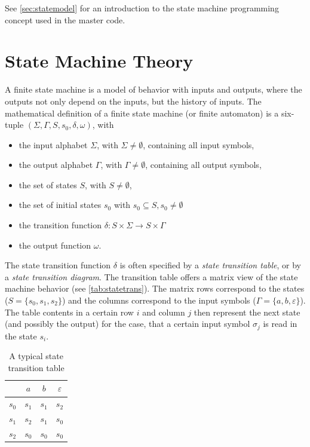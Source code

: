 \documentclass[a4paper,12pt,BCOR6mm,bibtotoc,idxtotoc]{scrbook}
\begin{document}
See \autoref{sec:statemodel} for an introduction to the state machine
programming concept used in the master code.


\section{State Machine Theory}
\label{sec:fsmtheory}

A finite state machine \cite{automata} is a model of behavior with
inputs and outputs, where the outputs not only depend on the inputs,
but the history of inputs. The mathematical definition of a finite
state machine (or finite automaton) is a six-tuple $(\Sigma, \Gamma,
S, s_0, \delta, \omega)$, with

\begin{itemize}
\item the input alphabet $\Sigma$, with $\Sigma \neq
  \emptyset$, containing all input symbols,
\item the output alphabet $\Gamma$, with $\Gamma \neq
  \emptyset$, containing all output symbols,
\item the set of states $S$, with $S \neq \emptyset$,
\item the set of initial states $s_0$ with $s_0 \subseteq S, s_0 \neq
  \emptyset$
\item the transition function $\delta: S \times \Sigma \rightarrow S
  \times \Gamma$
\item the output function $\omega$.
\end{itemize}

The state transition function $\delta$ is often specified by a
\textit{state transition table}, or by a \textit{state transition
  diagram}. The transition table offers a matrix view of the state
machine behavior (see \autoref{tab:statetrans}). The matrix rows
correspond to the states ($S = \{s_0, s_1, s_2\}$) and the columns
correspond to the input symbols ($\Gamma = \{a, b, \varepsilon\}$).
The table contents in a certain row $i$ and column $j$ then represent
the next state (and possibly the output) for the case, that a certain
input symbol $\sigma_j$ is read in the state $s_i$.

\begin{table}[htbp]
  \caption{A typical state transition table}
  \label{tab:statetrans}
  \vspace{2mm}
  \centering
  \begin{tabular}{l|ccc}
    & $a$ & $b$ & $\varepsilon$\\ \hline
    $s_0$ & $s_1$ & $s_1$ & $s_2$\\
    $s_1$ & $s_2$ & $s_1$ & $s_0$\\
    $s_2$ & $s_0$ & $s_0$ & $s_0$\\ \hline
  \end{tabular}
\end{table}
\end{document}

